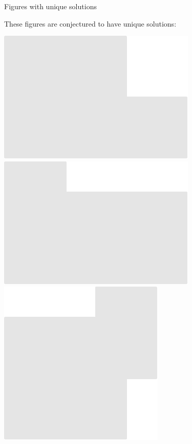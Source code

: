\documentclass[14pt]{beamer}
\begin{document}
    \begin{frame}{Figures with unique solutions}

        \vspace{-1em}
        \begin{center}
            These figures are conjectured to have unique solutions:

            \bigskip\medskip

            \includegraphics[scale=0.40]{figures/figure022e.pdf}\quad
            \includegraphics[scale=0.40]{figures/figure022z.pdf}\quad
            \includegraphics[scale=0.40]{figures/figure022f.pdf}\quad

\end{center}
\end{frame}
\end{document}
